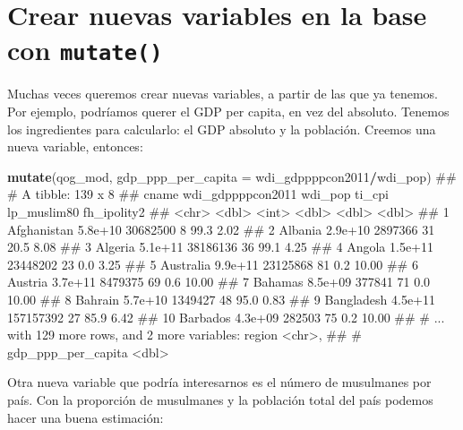\documentclass[]{book}
\newenvironment{Shaded}{\begin{snugshade}}{\end{snugshade}}
\newcommand{\KeywordTok}[1]{\textcolor[rgb]{0.13,0.29,0.53}{\textbf{#1}}}
\newcommand{\DataTypeTok}[1]{\textcolor[rgb]{0.13,0.29,0.53}{#1}}
\newcommand{\OperatorTok}[1]{\textcolor[rgb]{0.81,0.36,0.00}{\textbf{#1}}}
\newcommand{\NormalTok}[1]{#1}
\begin{document}
\section{\texorpdfstring{Crear nuevas variables en la base con
\texttt{mutate()}}{Crear nuevas variables en la base con mutate()}}\label{crear-nuevas-variables-en-la-base-con-mutate}

Muchas veces queremos crear nuevas variables, a partir de las que ya
tenemos. Por ejemplo, podríamos querer el GDP per capita, en vez del
absoluto. Tenemos los ingredientes para calcularlo: el GDP absoluto y la
población. Creemos una nueva variable, entonces:

\begin{Shaded}
\begin{Highlighting}[]
\KeywordTok{mutate}\NormalTok{(qog_mod, }\DataTypeTok{gdp_ppp_per_capita =}\NormalTok{ wdi_gdppppcon2011}\OperatorTok{/}\NormalTok{wdi_pop)}
\NormalTok{## # A tibble: 139 x 8}
\NormalTok{##          cname wdi_gdppppcon2011   wdi_pop ti_cpi lp_muslim80 fh_ipolity2}
\NormalTok{##          <chr>             <dbl>     <int>  <dbl>       <dbl>       <dbl>}
\NormalTok{##  1 Afghanistan           5.8e+10  30682500      8        99.3        2.02}
\NormalTok{##  2     Albania           2.9e+10   2897366     31        20.5        8.08}
\NormalTok{##  3     Algeria           5.1e+11  38186136     36        99.1        4.25}
\NormalTok{##  4      Angola           1.5e+11  23448202     23         0.0        3.25}
\NormalTok{##  5   Australia           9.9e+11  23125868     81         0.2       10.00}
\NormalTok{##  6     Austria           3.7e+11   8479375     69         0.6       10.00}
\NormalTok{##  7     Bahamas           8.5e+09    377841     71         0.0       10.00}
\NormalTok{##  8     Bahrain           5.7e+10   1349427     48        95.0        0.83}
\NormalTok{##  9  Bangladesh           4.5e+11 157157392     27        85.9        6.42}
\NormalTok{## 10    Barbados           4.3e+09    282503     75         0.2       10.00}
\NormalTok{## # ... with 129 more rows, and 2 more variables: region <chr>,}
\NormalTok{## #   gdp_ppp_per_capita <dbl>}
\end{Highlighting}
\end{Shaded}

Otra nueva variable que podría interesarnos es el número de musulmanes
por país. Con la proporción de musulmanes y la población total del país
podemos hacer una buena estimación:
\end{document}

